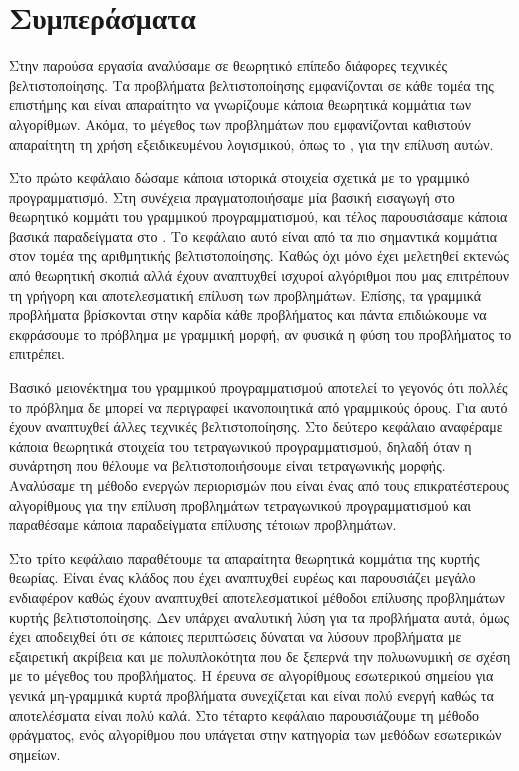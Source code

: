 \chapter{Συμπεράσματα}
Στην παρούσα εργασία αναλύσαμε σε θεωρητικό επίπεδο διάφορες τεχνικές
βελτιστοποίησης. Τα προβλήματα βελτιστοποίησης εμφανίζονται σε κάθε τομέα της
επιστήμης και είναι απαραίτητο να γνωρίζουμε κάποια θεωρητικά κομμάτια των
αλγορίθμων. Ακόμα, το μέγεθος των προβλημάτων που εμφανίζονται καθιστούν
απαραίτητη τη χρήση εξειδικευμένου λογισμικού, όπως το , για την
επίλυση αυτών.

Στο πρώτο κεφάλαιο δώσαμε κάποια ιστορικά στοιχεία σχετικά με
το γραμμικό προγραμματισμό. Στη συνέχεια πραγματοποιήσαμε μία βασική εισαγωγή
στο θεωρητικό κομμάτι του γραμμικού προγραμματισμού, και τέλος παρουσιάσαμε
κάποια βασικά παραδείγματα στο . Το κεφάλαιο αυτό είναι από τα πιο
σημαντικά κομμάτια στον τομέα της αριθμητικής βελτιστοποίησης. Καθώς όχι μόνο έχει
μελετηθεί εκτενώς από θεωρητική σκοπιά αλλά έχουν αναπτυχθεί ισχυροί
αλγόριθμοι που μας επιτρέπουν τη γρήγορη και αποτελεσματική επίλυση των
προβλημάτων. Επίσης, τα γραμμικά προβλήματα βρίσκονται στην καρδία κάθε
προβλήματος και πάντα επιδιώκουμε να εκφράσουμε το πρόβλημα με γραμμική μορφή,
αν φυσικά η φύση του προβλήματος το επιτρέπει.

Βασικό μειονέκτημα του γραμμικού προγραμματισμού αποτελεί το γεγονός ότι πολλές
το πρόβλημα δε μπορεί να περιγραφεί ικανοποιητικά από γραμμικούς όρους. Για αυτό
έχουν αναπτυχθεί άλλες τεχνικές βελτιστοποίησης. Στο δεύτερο κεφάλαιο αναφέραμε
κάποια θεωρητικά στοιχεία του τετραγωνικού προγραμματισμού, δηλαδή όταν η
συνάρτηση που θέλουμε να βελτιστοποιήσουμε είναι τετραγωνικής μορφής. Αναλύσαμε
τη μέθοδο ενεργών περιορισμών που είναι ένας από τους επικρατέστερους
αλγορίθμους για την επίλυση προβλημάτων τετραγωνικού προγραμματισμού και
παραθέσαμε κάποια παραδείγματα επίλυσης τέτοιων προβλημάτων.

Στο τρίτο κεφάλαιο παραθέτουμε τα απαραίτητα θεωρητικά κομμάτια της κυρτής
θεωρίας. Είναι ένας κλάδος που έχει αναπτυχθεί ευρέως και παρουσιάζει μεγάλο
ενδιαφέρον καθώς έχουν αναπτυχθεί αποτελεσματικοί μέθοδοι επίλυσης προβλημάτων
κυρτής βελτιστοποίησης. Δεν υπάρχει αναλυτική λύση για τα προβλήματα αυτά, όμως έχει
αποδειχθεί ότι σε κάποιες περιπτώσεις δύναται να λύσουν προβλήματα με εξαιρετική
ακρίβεια και με πολυπλοκότητα που δε ξεπερνά την πολυωνυμική σε σχέση με το μέγεθος
του προβλήματος. Η έρευνα σε αλγορίθμους εσωτερικού σημείου για γενικά
μη-γραμμικά κυρτά προβλήματα συνεχίζεται και είναι πολύ ενεργή καθώς τα
αποτελέσματα είναι πολύ καλά. Στο τέταρτο κεφάλαιο παρουσιάζουμε τη μέθοδο
φράγματος, ενός αλγορίθμου που υπάγεται στην κατηγορία των μεθόδων εσωτερικών
σημείων.

